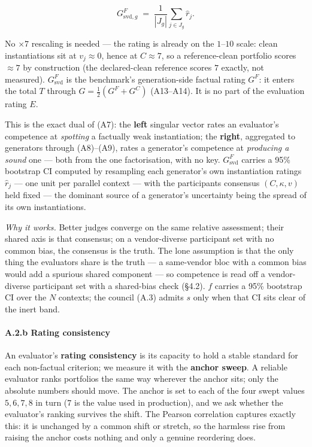 \[ G^{F}_{\text{svd},g} \;=\; \frac1{|J_g|}\sum_{j\in J_g}\hat r_j. \tag{A9}\]

No \(\times7\) rescaling is needed --- the rating is already on the \(1\)--\(10\) scale: clean instantiations sit at \(v_j\approx0\), hence at \(C\approx7\), so a reference-clean portfolio scores \(\approx7\) by construction (the declared-clean reference scores \(7\) exactly, not measured). \(G^{F}_{\text{svd}}\) is the benchmark's generation-side factual rating \(G^{F}\): it enters the total \(T\) through \(G=\tfrac12(G^{F}+G^{C})\) (A13--A14). It is no part of the evaluation rating \(E\).

This is the exact dual of (A7): the \textbf{left} singular vector rates an evaluator's competence at \emph{spotting} a factually weak instantiation; the \textbf{right}, aggregated to generators through (A8)--(A9), rates a generator's competence at \emph{producing a sound} one --- both from the one factorisation, with no key. \(G^{F}_{\text{svd}}\) carries a 95\% bootstrap CI computed by resampling each generator's own instantiation ratings \(\hat r_j\) --- one unit per parallel context --- with the participants consensus \((C,\kappa,v)\) held fixed --- the dominant source of a generator's uncertainty being the spread of its own instantiations.

\emph{Why it works.} Better judges converge on the same relative assessment; their shared axis is that consensus; on a vendor-diverse participant set with no common bias, the consensus is the truth. The lone assumption is that the only thing the evaluators share is the truth --- a same-vendor bloc with a common bias would add a spurious shared component --- so competence is read off a vendor-diverse participant set with a shared-bias check (§4.2). \(f\) carries a 95\% bootstrap CI over the \(N\) contexts; the council (A.3) admits \(s\) only when that CI sits clear of the inert band.

\paragraph{A.2.b Rating consistency}\label{a.2.b-rating-consistency}

An evaluator's \textbf{rating consistency} is its capacity to hold a stable standard for each non-factual criterion; we measure it with the \textbf{anchor sweep}. A reliable evaluator ranks portfolios the same way wherever the anchor sits; only the absolute numbers should move. The anchor is set to each of the four swept values \(5, 6, 7, 8\) in turn (\(7\) is the value used in production), and we ask whether the evaluator's ranking survives the shift. The Pearson correlation captures exactly this: it is unchanged by a common shift or stretch, so the harmless rise from raising the anchor costs nothing and only a genuine reordering does.

